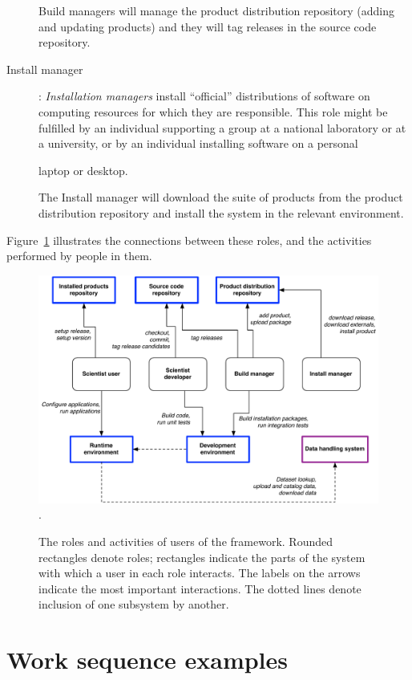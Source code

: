 \documentclass[draftmode,draftwater]{memarticle}
\newcommand{\cosmosis}{\name{CosmoSIS}\xspace}
\begin{document}
\begin{description}
  Build managers will manage the {product distribution repository} (adding and updating products) and they will tag releases in the source code repository.


\item[Install manager]: \emph{Installation managers} install
  ``official'' distributions of software on computing resources for
  which they are responsible. This role might be fulfilled by an
  individual supporting a group at a national laboratory or at a
  university, or by an individual installing software on a personal

  laptop or desktop.


  The Install manager will download the suite of products from the product distribution repository and install the system in the relevant environment.


\end{description}

Figure~\ref{fig:roles} illustrates the connections between these roles, and the activities
performed by people in them.
\begin{figure}
  \centering
  \includegraphics[width=\textwidth]{roles}.
  \caption{The roles and activities of users of the \cosmosis
    framework. Rounded rectangles denote roles; rectangles indicate
    the parts of the \cosmosis system with which a user in each role
    interacts. The labels on the arrows indicate the most important
    interactions. The dotted lines denote inclusion of one subsystem
    by another.}
  \label{fig:roles}
\end{figure}

\section{Work sequence examples}
\end{document}
